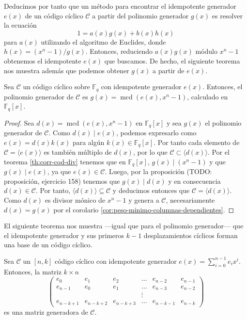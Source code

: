 Deducimos por tanto que un método para encontrar el idempotente generador \(e(x)\) de un código cíclico \(\mathcal C\) a partir del polinomio generador \(g(x)\) es resolver la ecuación \[1 = a(x)g(x) + b(x)h(x)\] para \(a(x)\) utilizando el algoritmo de Euclides, donde \(h(x) = (x^n - 1)/g(x)\).
Entonces, reduciendo \(a(x)g(x)\) módulo \(x^n - 1\) obtenemos el idempotente \(e(x)\) que buscamos.
De hecho, el siguiente teorema nos muestra además que podemos obtener \(g(x)\) a partir de \(e(x)\). 

\begin{theorem}
  Sea \(\mathcal C\) un código cíclico sobre \(\mathbb F_q\) con idempotente generador \(e(x)\).
  Entonces, el polinomio generador de \(\mathcal C\) es \(g(x) = \operatorname{mcd}(e(x), x^n - 1)\), calculado en \(\mathbb F_q[x]\). 
\end{theorem}

\begin{proof}
  Sea \(d(x) = \operatorname{mcd}(e(x), x^n - 1)\) en \(\mathbb F_q[x]\) y sea \(g(x)\) el polinomio generador de \(\mathcal C\).
  Como \(d(x) \mid e(x)\), podemos expresarlo como \(e(x) = d(x)k(x)\) para algún \(k(x) \in \mathbb F_q[x]\).
  Por tanto cada elemento de \(\mathcal C = \langle e(x) \rangle\) es también múltiplo de \(d(x)\), por lo que \(\mathcal C \subset \langle d(x) \rangle\).
  Por el teorema \ref{th:corr-cod-div} tenemos que en \(\mathbb F_q[x]\), \(g(x) \mid (x^n -1)\) y que \(g(x) \mid e(x)\), ya que \(e(x) \in \mathcal C\).
  Luego, por la proposición (TODO: proposición, ejercicio 158) tenemos que \(g(x) \mid d(x)\) y en consecuencia \(d(x) \in \mathcal C\).
  Por tanto, \(\langle d(x) \rangle \subseteq \mathcal C\) y deducimos entonces que \(\mathcal C = \langle d(x) \rangle\).
  Como \(d(x)\) es divisor mónico de \(x^n - 1\) y genera a \(\mathcal C\), necesariamente \(d(x) = g(x)\) por el corolario \ref{cor:peso-minimo-columnas-dependientes}. 
\end{proof}


El siguiente teorema nos muestra —igual que para el polinomio generador— que el idempotente generador y sus primeros \(k - 1\) desplazamientos cíclicos forman una base de un código cíclico.

\begin{theorem}
  Sea \(\mathcal C\) un \([n, k]\) código cíclico con idempotente generador \(e(x) = \sum_{i=0}^{n-1}e_ix^i\).
  Entonces, la matriz \(k \times n\)
  \[
    \begin{pmatrix*}
      e_0 & e_1 & e_2 & \dots & e_{n-2} & e_{n-1} \\
      e_{n-1} & e_0 & e_1 & \dots & e_{n-3} & e_{n-2} \\
       & & & \vdots & & \\
      e_{n-k+1} & e_{n-k+2} & e_{n-k+3} & \dots & e_{n-k-1} & e_{n-k}
    \end{pmatrix*}
  \] es una matriz generadora de \(\mathcal C\).
\end{theorem}

